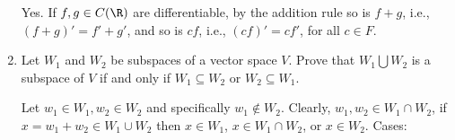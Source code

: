 \documentclass[10pt,a4paper]{report}
\begin{document}
\begin{enumerate}
	Yes. If $f,g\in C(\R)$ are differentiable, by the addition rule so is $f+g$, i.e., $(f+g)'=f'+g'$, and so is $cf$, i.e., $(cf)'=cf'$, for all $c\in F$.
	
	\setcounter{enumi}{18}
	\item Let $W_1$ and $W_2$ be subspaces of a vector space $V$.  Prove that $W_1 \bigcup W_2$ is a subspace of $V$ if and only if $W_1 \subseteq W_2$ or $W_2 \subseteq W_1$.
	
	Let $w_1 \in W_1, w_2 \in W_2$ and specifically $w_1 \not \in W_2$.  Clearly, $w_1, w_2 \in W_1\cap W_2$, if $x=w_1 + w_2 \in W_1\cup W_2$ then $x \in W_1$, $x \in W_1 \cap W_2$, or $x \in W_2$.  Cases: 
	
\end{enumerate}
\end{document}
